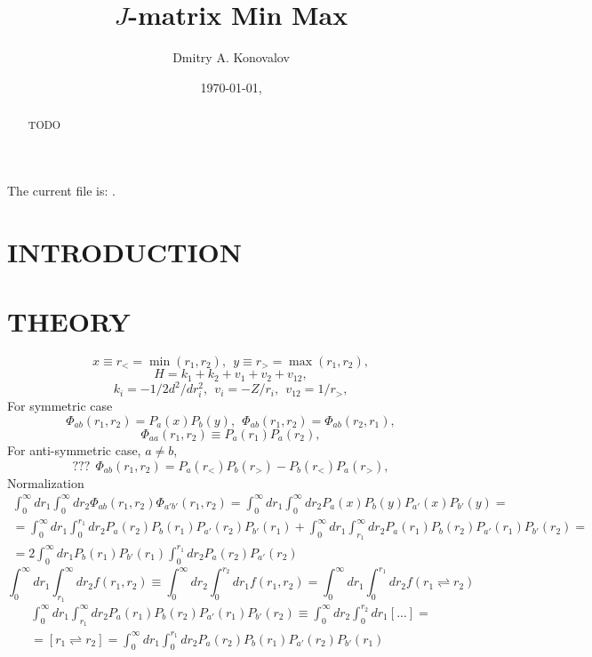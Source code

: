 \documentclass[aip
, pra
, showpacs
, aps
, onecolumn
, groupedaddress
, floatfix
]{revtex4}
\newcommand{\beq}{\begin{equation}}
\newcommand{\eeq}{\end{equation}}
\newcommand{\barr}{\begin{array}}
\newcommand{\earr}{\end{array}}
\begin{document}
\fontsize{12}{15}

\title {$J$-matrix Min Max}

\author{Dmitry A. Konovalov}

\date{\today, \currenttime}

\begin{abstract}
TODO

\end{abstract}

\maketitle
The current file is: \currfilename.

\section{INTRODUCTION}

\section{THEORY}
\beq
x \equiv r_< = \min(r_1, r_2), \ \ y \equiv r_> = \max(r_1, r_2),
\eeq
\beq
H = k_1 + k_2 + v_1 + v_2 + v_{12},
\eeq
\beq
k_i = -1/2 d^2/dr^2_i, \ \ v_i = - Z/r_i, \ \ v_{12} = 1/r_>,
\eeq
For symmetric case
\beq
\Phi_{ab}(r_1, r_2) = P_a(x) P_b(y), \ \ \Phi_{ab}(r_1, r_2) = \Phi_{ab}(r_2, r_1),
\eeq
\beq
\Phi_{aa}(r_1, r_2) \equiv P_a(r_1) P_a(r_2),
\eeq
For anti-symmetric case, $a \neq b$,
\beq
??? \ \  \Phi_{ab}(r_1, r_2) = P_a(r_<) P_b(r_>) - P_b(r_<) P_a(r_>),
\eeq
Normalization
\beq \barr{l}
\int_0^\infty dr_1 \int_0^\infty dr_2 \Phi_{ab}(r_1, r_2) \Phi_{a'b'}(r_1, r_2)
=\int_0^\infty dr_1 \int_0^\infty dr_2 P_a(x) P_b(y) P_{a'}(x)  P_{b'}(y)=\\
= \int_0^\infty dr_1  \int_0^{r_1} dr_2 P_a(r_2) P_b(r_1) P_{a'}(r_2) P_{b'}(r_1)
+\int_0^\infty dr_1  \int_{r_1}^\infty dr_2 P_a(r_1) P_b(r_2) P_{a'}(r_1) P_{b'}(r_2)  =\\
= 2 \int_0^\infty dr_1  P_b(r_1) P_{b'}(r_1) \int_0^{r_1} dr_2 P_a(r_2) P_{a'}(r_2)
\earr \eeq
\beq
\int_0^\infty dr_1  \int_{r_1}^\infty dr_2 f(r_1, r_2) \equiv \int_0^\infty dr_2  \int_0^{r_2} dr_1 f(r_1, r_2)
= \int_0^\infty dr_1  \int_0^{r_1} dr_2 f(r_1 \rightleftharpoons r_2)
\eeq
\beq \barr{l}
\int_0^\infty dr_1  \int_{r_1}^\infty dr_2 P_a(r_1) P_b(r_2) P_{a'}(r_1) P_{b'}(r_2)
\equiv \int_0^\infty dr_2  \int_0^{r_2} dr_1 [...] =\\
= [r_1 \rightleftharpoons r_2]
=\int_0^\infty dr_1  \int_0^{r_1} dr_2 P_a(r_2) P_b(r_1) P_{a'}(r_2) P_{b'}(r_1)
\earr \eeq
\end{document}
